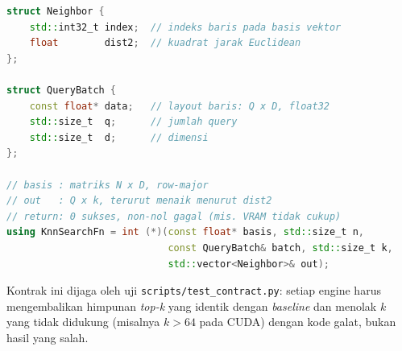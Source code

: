 \documentclass[12pt,a4paper,oneside]{report}
\begin{document}
\begin{lstlisting}[style=cppstyle,language=C++,caption={Kontrak \texttt{KnnSearchFn} (sumber: \texttt{engine/include/knn\_engine.h}).},label={lst:kontrak}]
struct Neighbor {
    std::int32_t index;  // indeks baris pada basis vektor
    float        dist2;  // kuadrat jarak Euclidean
};

struct QueryBatch {
    const float* data;   // layout baris: Q x D, float32
    std::size_t  q;      // jumlah query
    std::size_t  d;      // dimensi
};

// basis : matriks N x D, row-major
// out   : Q x k, terurut menaik menurut dist2
// return: 0 sukses, non-nol gagal (mis. VRAM tidak cukup)
using KnnSearchFn = int (*)(const float* basis, std::size_t n,
                            const QueryBatch& batch, std::size_t k,
                            std::vector<Neighbor>& out);
\end{lstlisting}

\noindent Kontrak ini dijaga oleh uji \texttt{scripts/test\_contract.py}: setiap engine harus mengembalikan himpunan \textit{top-k} yang identik dengan \textit{baseline} dan menolak $k$ yang tidak didukung (misalnya $k>64$ pada CUDA) dengan kode galat, bukan hasil yang salah.
\end{document}
